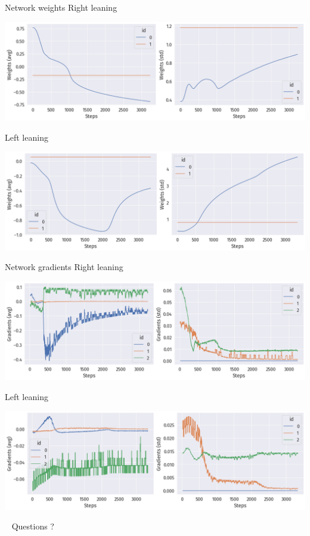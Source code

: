 \documentclass[bigger]{beamer}
\begin{document}
\begin{frame}[label={sec:orge74e4b4}]{Network weights}
\centering
\scriptsize
Right leaning
\vspace{-1em}
\begin{center}
\includegraphics[width=\textwidth]{img/DRL-weights.png}
\end{center}

\vspace{-1em}
\centering
\scriptsize
Left leaning
\vspace{-1em}
\begin{center}
\includegraphics[width=\textwidth]{img/DRL-weights2.png}
\end{center}
\end{frame}
\begin{frame}[label={sec:org163efb6}]{Network gradients}
\centering
\scriptsize
Right leaning
\vspace{-1em}
\begin{center}
\includegraphics[width=\textwidth]{img/DRL-gradients.png}
\end{center}

\vspace{-1em}
\centering
\scriptsize
Left leaning
\vspace{-1em}
\begin{center}
\includegraphics[width=\textwidth]{img/DRL-gradients2.png}
\end{center}
\end{frame}
\begin{frame}[label={sec:org865fe73},standout]{~}
Questions ?
\end{frame}
\end{document}
